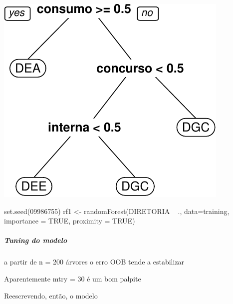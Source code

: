 \documentclass[]{article}
\newenvironment{Shaded}{\begin{snugshade}}{\end{snugshade}}
\newcommand{\NormalTok}[1]{#1}
\let\oldsubparagraph\subparagraph
\renewcommand{\subparagraph}[1]{\oldsubparagraph{#1}\mbox{}}
\begin{document}
\includegraphics{markdown_v31_files/figure-latex/unnamed-chunk-84-2.pdf}

\begin{Shaded}
\begin{Highlighting}[]
\NormalTok{set.seed(09986755)}
\NormalTok{rf1 <- randomForest(DIRETORIA ~ ., data=training,}
\NormalTok{                    importance = TRUE,}
\NormalTok{                    proximity = TRUE)}
\end{Highlighting}
\end{Shaded}

\subparagraph{Tuning do modelo}\label{tuning-do-modelo}

a partir de n = 200 árvores o erro OOB tende a estabilizar

Aparentemente mtry = 30 é um bom palpite

Reescrevendo, então, o modelo
\end{document}
